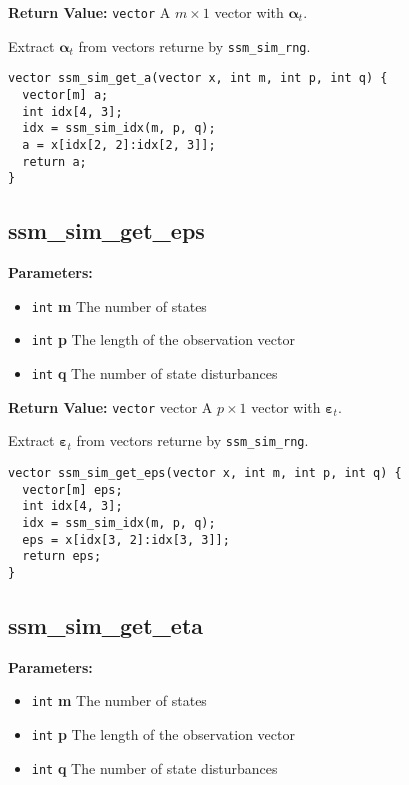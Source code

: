 \documentclass[]{book}
\providecommand{\tightlist}{%
  \setlength{\itemsep}{0pt}\setlength{\parskip}{0pt}}
\renewcommand{\vec}[1]{\boldsymbol{#1}}
\begin{document}
\textbf{Return Value:} \texttt{vector} A \(m \times 1\) vector with
\(\vec{\alpha}_t\).

Extract \(\vec{\alpha}_t\) from vectors returne by
\texttt{ssm\_sim\_rng}.

\begin{verbatim}
vector ssm_sim_get_a(vector x, int m, int p, int q) {
  vector[m] a;
  int idx[4, 3];
  idx = ssm_sim_idx(m, p, q);
  a = x[idx[2, 2]:idx[2, 3]];
  return a;
}
\end{verbatim}

\subsection{ssm\_sim\_get\_eps}\label{ssmux5fsimux5fgetux5feps}

\textbf{Parameters:}

\begin{itemize}
\tightlist
\item
  \texttt{int} \textbf{m} The number of states
\item
  \texttt{int} \textbf{p} The length of the observation vector
\item
  \texttt{int} \textbf{q} The number of state disturbances
\end{itemize}

\textbf{Return Value:} \texttt{vector} vector A \(p \times 1\) vector
with \(\vec{\varepsilon}_t\).

Extract \(\vec{\varepsilon}_t\) from vectors returne by
\texttt{ssm\_sim\_rng}.

\begin{verbatim}
vector ssm_sim_get_eps(vector x, int m, int p, int q) {
  vector[m] eps;
  int idx[4, 3];
  idx = ssm_sim_idx(m, p, q);
  eps = x[idx[3, 2]:idx[3, 3]];
  return eps;
}
\end{verbatim}

\subsection{ssm\_sim\_get\_eta}\label{ssmux5fsimux5fgetux5feta}

\textbf{Parameters:}

\begin{itemize}
\tightlist
\item
  \texttt{int} \textbf{m} The number of states
\item
  \texttt{int} \textbf{p} The length of the observation vector
\item
  \texttt{int} \textbf{q} The number of state disturbances
\end{itemize}
\end{document}
